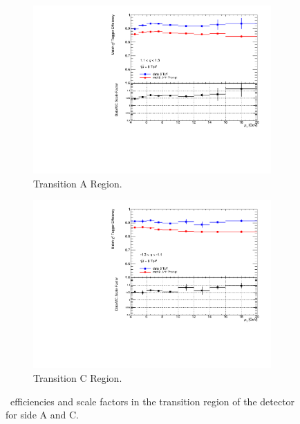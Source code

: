 \begin{figure}[htbp]
  \centering
  \begin{subfigure}[b]{0.85\textwidth}
    \includegraphics[width=\textwidth]{PartCalibration2012/Plots/SFPlots/Transition_A_smt.pdf}
    \caption{Transition A Region.} \label{fig:CalibrationScaleFactorTransitionA}
  \end{subfigure}
  
  \begin{subfigure}[b]{0.85\textwidth}
    \includegraphics[width=\textwidth]{PartCalibration2012/Plots/SFPlots/Transition_C_smt.pdf}
    \caption{Transition C Region.} \label{fig:CalibrationScaleFactorTransitionC}
  \end{subfigure}
  \caption{\xsm\ efficiencies and scale factors in the transition region of the detector for side  A and  C.} \label{fig:CalibrationScaleFactorTransition}
\end{figure}

